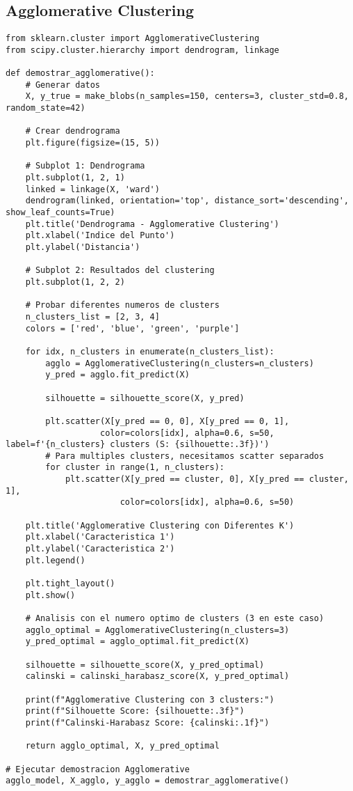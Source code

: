 \documentclass[12pt]{article}
\begin{document}
\subsection{Agglomerative Clustering}

\begin{lstlisting}
from sklearn.cluster import AgglomerativeClustering
from scipy.cluster.hierarchy import dendrogram, linkage

def demostrar_agglomerative():
    # Generar datos
    X, y_true = make_blobs(n_samples=150, centers=3, cluster_std=0.8, random_state=42)
    
    # Crear dendrograma
    plt.figure(figsize=(15, 5))
    
    # Subplot 1: Dendrograma
    plt.subplot(1, 2, 1)
    linked = linkage(X, 'ward')
    dendrogram(linked, orientation='top', distance_sort='descending', show_leaf_counts=True)
    plt.title('Dendrograma - Agglomerative Clustering')
    plt.xlabel('Indice del Punto')
    plt.ylabel('Distancia')
    
    # Subplot 2: Resultados del clustering
    plt.subplot(1, 2, 2)
    
    # Probar diferentes numeros de clusters
    n_clusters_list = [2, 3, 4]
    colors = ['red', 'blue', 'green', 'purple']
    
    for idx, n_clusters in enumerate(n_clusters_list):
        agglo = AgglomerativeClustering(n_clusters=n_clusters)
        y_pred = agglo.fit_predict(X)
        
        silhouette = silhouette_score(X, y_pred)
        
        plt.scatter(X[y_pred == 0, 0], X[y_pred == 0, 1], 
                   color=colors[idx], alpha=0.6, s=50, label=f'{n_clusters} clusters (S: {silhouette:.3f})')
        # Para multiples clusters, necesitamos scatter separados
        for cluster in range(1, n_clusters):
            plt.scatter(X[y_pred == cluster, 0], X[y_pred == cluster, 1], 
                       color=colors[idx], alpha=0.6, s=50)
    
    plt.title('Agglomerative Clustering con Diferentes K')
    plt.xlabel('Caracteristica 1')
    plt.ylabel('Caracteristica 2')
    plt.legend()
    
    plt.tight_layout()
    plt.show()
    
    # Analisis con el numero optimo de clusters (3 en este caso)
    agglo_optimal = AgglomerativeClustering(n_clusters=3)
    y_pred_optimal = agglo_optimal.fit_predict(X)
    
    silhouette = silhouette_score(X, y_pred_optimal)
    calinski = calinski_harabasz_score(X, y_pred_optimal)
    
    print(f"Agglomerative Clustering con 3 clusters:")
    print(f"Silhouette Score: {silhouette:.3f}")
    print(f"Calinski-Harabasz Score: {calinski:.1f}")
    
    return agglo_optimal, X, y_pred_optimal

# Ejecutar demostracion Agglomerative
agglo_model, X_agglo, y_agglo = demostrar_agglomerative()
\end{lstlisting}
\end{document}
